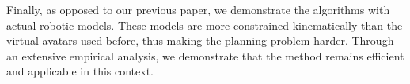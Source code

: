 \documentclass[journal]{IEEEtran}
\providecommand{\DIFaddtex}[1]{#1} %
\providecommand{\DIFaddbegin}{\protect\color{blue}} %
\providecommand{\DIFaddend}{\protect\color{black}} %
\providecommand{\DIFadd}[1]{\texorpdfstring{\DIFaddtex{#1}}{#1}} %
\begin{document}
\DIFaddbegin 

\DIFadd{Finally, as opposed to our previous paper, we demonstrate the algorithms with actual robotic models. These models are more constrained kinematically than the virtual avatars used before,
thus making the planning problem harder. Through an extensive empirical analysis, we demonstrate that the method remains efficient and applicable in this context.
}\DIFaddend %
\end{document}
